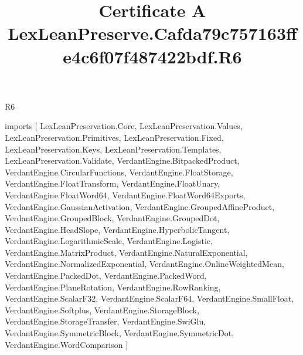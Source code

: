 \begin{lexlean}{R6}
\title{Certificate A LexLeanPreserve.Cafda79c757163ffe4c6f07f487422bdf.R6}
\begin{coremodule}
imports [
  LexLeanPreservation.Core,
  LexLeanPreservation.Values,
  LexLeanPreservation.Primitives,
  LexLeanPreservation.Fixed,
  LexLeanPreservation.Keys,
  LexLeanPreservation.Templates,
  LexLeanPreservation.Validate,
  VerdantEngine.BitpackedProduct,
  VerdantEngine.CircularFunctions,
  VerdantEngine.FloatStorage,
  VerdantEngine.FloatTransform,
  VerdantEngine.FloatUnary,
  VerdantEngine.FloatWord64,
  VerdantEngine.FloatWord64Exports,
  VerdantEngine.GaussianActivation,
  VerdantEngine.GroupedAffineProduct,
  VerdantEngine.GroupedBlock,
  VerdantEngine.GroupedDot,
  VerdantEngine.HeadSlope,
  VerdantEngine.HyperbolicTangent,
  VerdantEngine.LogarithmicScale,
  VerdantEngine.Logistic,
  VerdantEngine.MatrixProduct,
  VerdantEngine.NaturalExponential,
  VerdantEngine.NormalizedExponential,
  VerdantEngine.OnlineWeightedMean,
  VerdantEngine.PackedDot,
  VerdantEngine.PackedWord,
  VerdantEngine.PlaneRotation,
  VerdantEngine.RowRanking,
  VerdantEngine.ScalarF32,
  VerdantEngine.ScalarF64,
  VerdantEngine.SmallFloat,
  VerdantEngine.Softplus,
  VerdantEngine.StorageBlock,
  VerdantEngine.StorageTransfer,
  VerdantEngine.SwiGlu,
  VerdantEngine.SymmetricBlock,
  VerdantEngine.SymmetricDot,
  VerdantEngine.WordComparison
]


\end{coremodule}
\end{lexlean}
